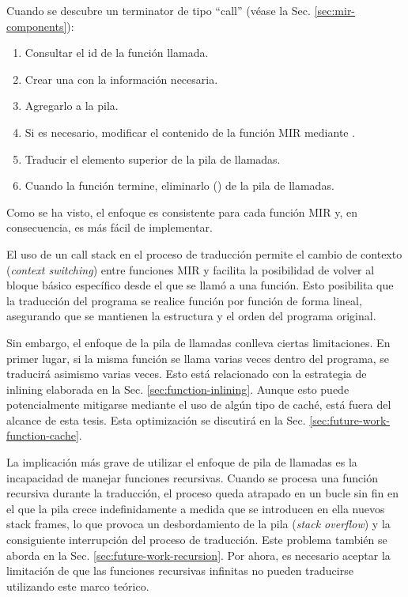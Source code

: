 Cuando se descubre un terminator de tipo ``call'' (véase la Sec. \ref{sec:mir-components}):

\begin{enumerate}
    \item Consultar el id de la función llamada.
    \item Crear una  con la información necesaria.
    \item Agregarlo a la pila.
    \item Si es necesario, modificar el contenido de la función \acrshort{MIR} mediante .
    \item Traducir el elemento superior de la pila de llamadas.
    \item Cuando la función termine, eliminarlo () de la pila de llamadas.
\end{enumerate}

Como se ha visto, el enfoque es consistente para cada función \acrshort{MIR} y,
en consecuencia, es más fácil de implementar.

El uso de un call stack en el proceso de traducción permite el cambio de contexto
(\textit{context switching}) entre funciones \acrshort{MIR}
y facilita la posibilidad de volver al bloque básico específico desde el que se
llamó a una función. Esto posibilita que la traducción del programa se realice función por
función de forma lineal, asegurando que se mantienen la estructura y el orden del programa
original.

Sin embargo, el enfoque de la pila de llamadas conlleva ciertas limitaciones.
En primer lugar, si la misma función se llama varias veces dentro del programa,
se traducirá asimismo varias veces.
Esto está relacionado con la estrategia de inlining elaborada en la Sec. \ref{sec:function-inlining}.
Aunque esto puede potencialmente mitigarse mediante el uso de algún tipo de caché, está fuera del alcance de esta
tesis. Esta optimización se discutirá en la Sec. \ref{sec:future-work-function-cache}.

La implicación más grave de utilizar el enfoque de pila de llamadas es la incapacidad de
manejar funciones recursivas. Cuando se procesa una función recursiva durante la traducción,
el proceso queda atrapado en un bucle sin fin en el que la pila crece
indefinidamente a medida que se introducen en ella nuevos stack frames,
lo que provoca un desbordamiento de la pila (\textit{stack overflow})
y la consiguiente interrupción del proceso de traducción. Este problema
también se aborda en la Sec. \ref{sec:future-work-recursion}.
Por ahora, es necesario aceptar la limitación de que las
funciones recursivas infinitas no pueden traducirse utilizando este marco teórico.

